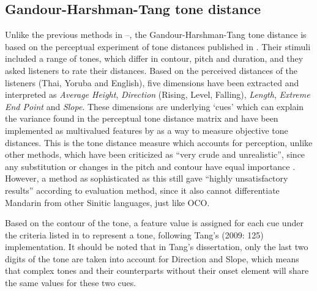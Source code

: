 \documentclass[output=paper, chinesefont]{langscibook}
\begin{document}
\subsection{Gandour-Harshman-Tang tone distance}
\label{sec:sung:3.5}
Unlike the previous methods in --, the Gandour-Harshman-Tang tone distance is based on the perceptual experiment of tone distances published in \citet{GandourHarshman1978}. Their stimuli included a range of tones, which differ in contour, pitch and duration, and they asked listeners to rate their distances. Based on the perceived distances of the listeners (Thai, Yoruba and English), five dimensions have been extracted and interpreted as \textit{Average Height}, \textit{Direction} (Rising, Level, Falling), \textit{Length}, \textit{Extreme End Point} and \textit{Slope}. These dimensions are underlying ‘cues’ which can explain the variance found in the perceptual tone distance matrix and have been implemented as multivalued features by \citet[125--126]{Tang2009} as a way to measure objective tone distances. This is the tone distance measure which accounts for perception, unlike other methods, which have been criticized as “very crude and unrealistic”, since any substitution or changes in the pitch and contour have equal importance \citep[125]{Tang2009}. However, a method as sophisticated as this still gave “highly unsatisfactory results” according to  evaluation method, since it also cannot differentiate Mandarin from other Sinitic languages, just like OCO.

Based on the contour of the tone, a feature value is assigned for each cue under the criteria listed in  to represent a tone, following Tang’s (2009: 125) implementation. It should be noted that in Tang’s dissertation, only the last two digits of the tone are taken into account for Direction and Slope, which means that complex tones and their counterparts without their onset element will share the same values for these two cues. 
\end{document}
